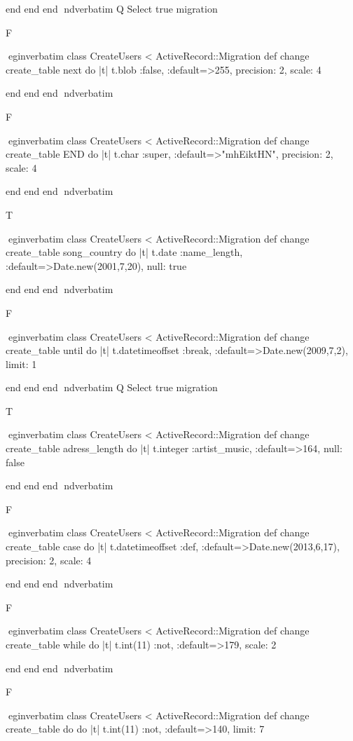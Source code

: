     end 
  end 
end
nd{verbatim}
Q
 Select true migration

F

egin{verbatim}
 class CreateUsers < ActiveRecord::Migration 
  def change 
    create_table next do |t| 
      t.blob :false, :default=>255, precision: 2, scale: 4
    
    end 
  end 
end
nd{verbatim}

F

egin{verbatim}
 class CreateUsers < ActiveRecord::Migration 
  def change 
    create_table END do |t| 
      t.char :super, :default=>"mhEiktHN", precision: 2, scale: 4
    
    end 
  end 
end
nd{verbatim}

T

egin{verbatim}
 class CreateUsers < ActiveRecord::Migration 
  def change 
    create_table song_country do |t| 
      t.date :name_length, :default=>Date.new(2001,7,20), null: true
    
    end 
  end 
end
nd{verbatim}

F

egin{verbatim}
 class CreateUsers < ActiveRecord::Migration 
  def change 
    create_table until do |t| 
      t.datetimeoffset :break, :default=>Date.new(2009,7,2), limit: 1
    
    end 
  end 
end
nd{verbatim}
Q
 Select true migration

T

egin{verbatim}
 class CreateUsers < ActiveRecord::Migration 
  def change 
    create_table adress_length do |t| 
      t.integer :artist_music, :default=>164, null: false
    
    end 
  end 
end
nd{verbatim}

F

egin{verbatim}
 class CreateUsers < ActiveRecord::Migration 
  def change 
    create_table case do |t| 
      t.datetimeoffset :def, :default=>Date.new(2013,6,17), precision: 2, scale: 4
    
    end 
  end 
end
nd{verbatim}

F

egin{verbatim}
 class CreateUsers < ActiveRecord::Migration 
  def change 
    create_table while do |t| 
      t.int(11) :not, :default=>179, scale: 2
    
    end 
  end 
end
nd{verbatim}

F

egin{verbatim}
 class CreateUsers < ActiveRecord::Migration 
  def change 
    create_table do do |t| 
      t.int(11) :not, :default=>140, limit: 7
    
